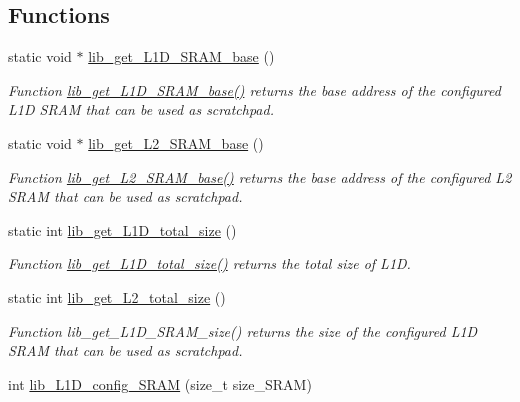 \subsection*{Functions}
\begin{DoxyCompactItemize}
\item 
static void $\ast$ \hyperlink{group__libarch__cachecfg_gad97b5b052a148beb2ceafd5264049734}{lib\+\_\+get\+\_\+\+L1\+D\+\_\+\+S\+R\+A\+M\+\_\+base} ()
\begin{DoxyCompactList}\small\item\em Function \hyperlink{group__libarch__cachecfg_gad97b5b052a148beb2ceafd5264049734}{lib\+\_\+get\+\_\+\+L1\+D\+\_\+\+S\+R\+A\+M\+\_\+base()} returns the base address of the configured L1\+D S\+R\+A\+M that can be used as scratchpad. \end{DoxyCompactList}\item 
static void $\ast$ \hyperlink{group__libarch__cachecfg_ga078718972313d9481ce24aa6620a01a7}{lib\+\_\+get\+\_\+\+L2\+\_\+\+S\+R\+A\+M\+\_\+base} ()
\begin{DoxyCompactList}\small\item\em Function \hyperlink{group__libarch__cachecfg_ga078718972313d9481ce24aa6620a01a7}{lib\+\_\+get\+\_\+\+L2\+\_\+\+S\+R\+A\+M\+\_\+base()} returns the base address of the configured L2 S\+R\+A\+M that can be used as scratchpad. \end{DoxyCompactList}\item 
static int \hyperlink{group__libarch__cachecfg_ga6771320bcc11145aba7c8ac3d960cee7}{lib\+\_\+get\+\_\+\+L1\+D\+\_\+total\+\_\+size} ()
\begin{DoxyCompactList}\small\item\em Function \hyperlink{group__libarch__cachecfg_ga6771320bcc11145aba7c8ac3d960cee7}{lib\+\_\+get\+\_\+\+L1\+D\+\_\+total\+\_\+size()} returns the total size of L1\+D. \end{DoxyCompactList}\item 
static int \hyperlink{group__libarch__cachecfg_ga36b0570810554cc39ca3edd82fbff7c4}{lib\+\_\+get\+\_\+\+L2\+\_\+total\+\_\+size} ()
\begin{DoxyCompactList}\small\item\em Function lib\+\_\+get\+\_\+\+L1\+D\+\_\+\+S\+R\+A\+M\+\_\+size() returns the size of the configured L1\+D S\+R\+A\+M that can be used as scratchpad. \end{DoxyCompactList}\item 
int \hyperlink{group__libarch__cachecfg_ga3380d4452c454d398a64256c8eeed723}{lib\+\_\+\+L1\+D\+\_\+config\+\_\+\+S\+R\+A\+M} (size\+\_\+t size\+\_\+\+S\+R\+A\+M)

\end{DoxyCompactItemize}
